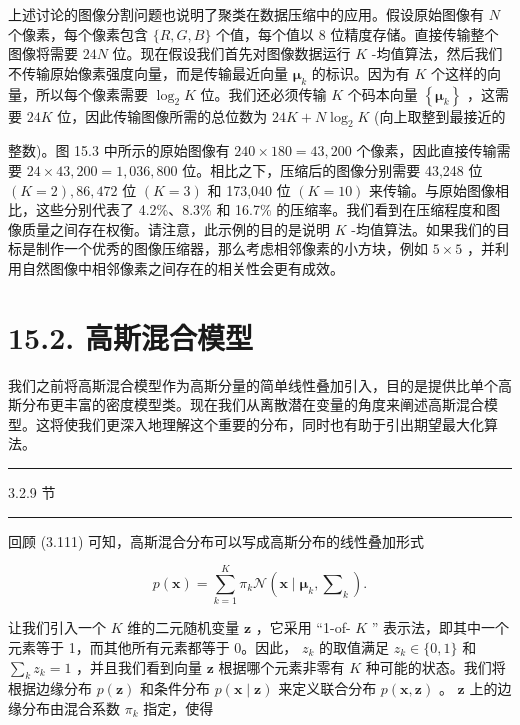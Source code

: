 \documentclass[10pt]{report}
\newcommand{\HRule}{\begin{center}\rule{0.9\linewidth}{0.2mm}\end{center}}
\begin{document}
上述讨论的图像分割问题也说明了聚类在数据压缩中的应用。假设原始图像有 \(N\) 个像素，每个像素包含 \(\{ R,G,B\}\) 个值，每个值以 8 位精度存储。直接传输整个图像将需要 \({24N}\) 位。现在假设我们首先对图像数据运行 \(K\) -均值算法，然后我们不传输原始像素强度向量，而是传输最近向量 \({\mathbf{\mu }}_{k}\) 的标识。因为有 \(K\) 个这样的向量，所以每个像素需要 \({\log }_{2}K\) 位。我们还必须传输 \(K\) 个码本向量 \(\left\{  {\mathbf{\mu }}_{k}\right\}\) ，这需要 \({24K}\) 位，因此传输图像所需的总位数为 \({24K} + N{\log }_{2}K\) (向上取整到最接近的

整数)。图 15.3 中所示的原始图像有 \({240} \times  {180} = {43},{200}\) 个像素，因此直接传输需要 \({24} \times  {43},{200} = 1,{036},{800}\) 位。相比之下，压缩后的图像分别需要 43,248 位 \(\left( {K = 2}\right) ,{86},{472}\) 位 \(\left( {K = 3}\right)\) 和 173,040 位 \(\left( {K = {10}}\right)\) 来传输。与原始图像相比，这些分别代表了 4.2\%、8.3\% 和 16.7\% 的压缩率。我们看到在压缩程度和图像质量之间存在权衡。请注意，此示例的目的是说明 \(K\) -均值算法。如果我们的目标是制作一个优秀的图像压缩器，那么考虑相邻像素的小方块，例如 \(5 \times  5\) ，并利用自然图像中相邻像素之间存在的相关性会更有成效。

\section*{15.2. 高斯混合模型}

我们之前将高斯混合模型作为高斯分量的简单线性叠加引入，目的是提供比单个高斯分布更丰富的密度模型类。现在我们从离散潜在变量的角度来阐述高斯混合模型。这将使我们更深入地理解这个重要的分布，同时也有助于引出期望最大化算法。

\HRule

3.2.9 节

\HRule

回顾 (3.111) 可知，高斯混合分布可以写成高斯分布的线性叠加形式

\[
p\left( \mathbf{x}\right)  = \mathop{\sum }\limits_{{k = 1}}^{K}{\pi }_{k}\mathcal{N}\left( {\mathbf{x} \mid  {\mathbf{\mu }}_{k},{\mathbf{\sum }}_{k}}\right) . \tag{15.6}
\]

让我们引入一个 \(K\) 维的二元随机变量 \(\mathbf{z}\) ，它采用 “1-of- \(K\) ” 表示法，即其中一个元素等于 1，而其他所有元素都等于 0。因此， \({z}_{k}\) 的取值满足 \({z}_{k} \in  \{ 0,1\}\) 和 \(\mathop{\sum }\limits_{k}{z}_{k} = 1\) ，并且我们看到向量 \(\mathbf{z}\) 根据哪个元素非零有 \(K\) 种可能的状态。我们将根据边缘分布 \(p\left( \mathbf{z}\right)\) 和条件分布 \(p\left( {\mathbf{x} \mid  \mathbf{z}}\right)\) 来定义联合分布 \(p\left( {\mathbf{x},\mathbf{z}}\right)\) 。 \(\mathbf{z}\) 上的边缘分布由混合系数 \({\pi }_{k}\) 指定，使得
\end{document}
